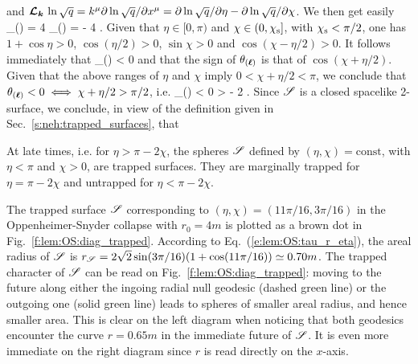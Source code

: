  and
 $\bm{\mathcal{L}}_{\bm{\bm{k}}}\, \ln \sqrt{q} = k^\mu \partial \ln\sqrt{q} /\partial x^\mu =
 \partial \ln\sqrt{q} /\partial \eta - \partial\ln  \sqrt{q} /\partial \chi$.
We then get easily
\be
    \theta_{(\wl)} = 4 
    \qand
    \theta_{()} = - 4  .
\ee
Given that $\eta\in [0,\pi)$ %
and $\chi\in(0,\chi_{\rm s}]$, with $\chi_{\rm s} < \pi/2$,
one has $1 + \cos\eta > 0$, $\cos(\eta/2) > 0$, $\sin\chi > 0$
and $\cos(\chi - \eta/2) > 0$. It follows immediately that
\be
    \theta_{()} < 0
\ee
and that the sign of $\theta_{(\bm{\ell})}$ is that of $\cos(\chi + \eta/2)$.
Given that the above ranges of $\eta$ and $\chi$ imply $0 < \chi + \eta/2 < \pi$,
we conclude that $\theta_{(\bm{\ell})} < 0 \iff \chi + \eta/2 > \pi/2$, i.e.
\be
    \theta_{(\wl)} < 0 \iff \eta > \pi - 2 \chi .
\ee
Since $\mathscr{S}$ is a closed spacelike 2-surface,
we conclude, in view of the definition given in Sec.~\ref{s:neh:trapped_surfaces}, that
\begin{greybox}
At late times, i.e. for $\eta > \pi - 2 \chi$, the spheres $\mathscr{S}$ defined
by $(\eta,\chi) = \mathrm{const}$, with $\eta<\pi$ and $\chi>0$,
are trapped surfaces. They are marginally trapped for $\eta = \pi - 2 \chi$
and untrapped for $\eta <  \pi - 2 \chi$.
\end{greybox}

\begin{example}
The trapped surface $\mathscr{S}$ corresponding to $(\eta,\chi) = (11\pi/16, 3\pi/16)$
in the Oppen\-heimer-Snyder collapse with $r_0 = 4 m$
is plotted as a brown dot in Fig.~\ref{f:lem:OS:diag_trapped}. According
to Eq.~(\ref{e:lem:OS:tau_r_eta}), the areal radius of $\mathscr{S}$ is
$r_{\mathscr{S}} = 2\sqrt{2} \sin(3\pi/16) (1 + \cos(11\pi/16)) \simeq 0.70 m$.
The trapped character of $\mathscr{S}$ can be read on Fig.~\ref{f:lem:OS:diag_trapped}:
moving to the future along either the ingoing radial null geodesic (dashed green line)
or the outgoing one (solid green line) leads to spheres of smaller areal radius,
and hence smaller area. This is clear on the left diagram when noticing
that both geodesics encounter the curve $r=0.65 m$ in the immediate future of $\mathscr{S}$.
It is even more immediate on the right diagram since $r$ is read directly on the $x$-axis.
\end{example}

